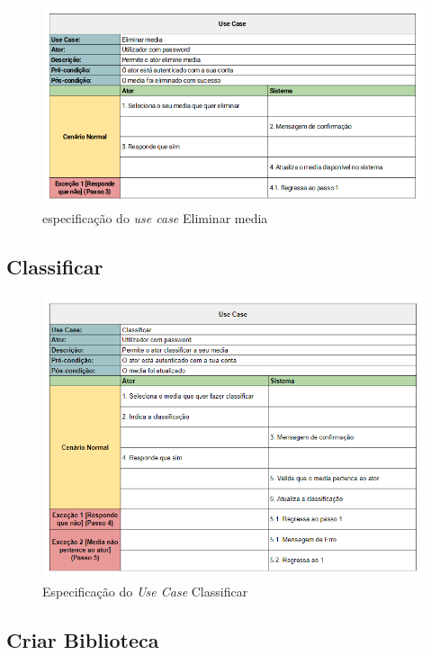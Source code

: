\documentclass[a4paper]{report}
\begin{document}
\begin{figure}[h]
	\centering 
    \includegraphics[width=\textwidth]{images/Eliminar_media.png}  
    \caption{especificação do \emph{use case} Eliminar media}
\end{figure}


\subsection{Classificar}

\begin{figure}[H]
	\centering 
    \includegraphics[width=\textwidth]{images/Classificar.png}  
    \caption{Especificação do \emph{Use Case} Classificar}
\end{figure}

\subsection{Criar Biblioteca}
\end{document}
